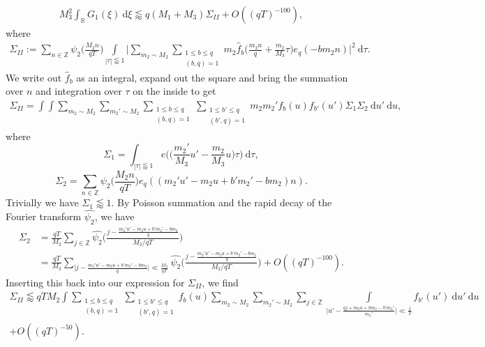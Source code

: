 \documentclass[12pt]{amsart}
\theoremstyle{definition}
\theoremstyle{plain}
\theoremstyle{remark}
\numberwithin{equation}{section}
\numberwithin{theorem}{section}
\numberwithin{equation}{section}
\begin{document}
	\begin{align}
		M_{3}^{2}\int_{\mathbb{R}}G_{1}(\xi)\: \mathrm{d} \xi \lessapprox q(M_{1}+M_{3}) \varSigma_{II}+O((qT)^{-100}), \label{Sigma II equation}
	\end{align}
	where
	\begin{align*}
		\varSigma_{II} := \sum_{n \in \mathbb{Z}}\psi_{2}\bigg(\frac{M_{2}n}{qT}\bigg)
		\int \limits_{|\tau|\lessapprox 1}
		\biggl|\sum_{m_{2}\sim M_{2}}
		\sum_{\substack{1 \leq b \leq q \\ (b, q)=1}}m_{2}\hat{f}_{b}\bigg(\frac{m_{2}n}{q}+\frac{m_{2}}{M_{3}}\tau\bigg)
		e_q({-bm_{2}n})\biggl|^{2}\: \mathrm{d} \tau.
	\end{align*}
	We write out $\hat{f}_{b}$ as an integral, expand out the square and bring the summation over $n$ and integration over $\tau$ on the inside to get
	\begin{align*}
		\varSigma_{II}=\int \int
		\sum_{m_{2}\sim M_{2}}\sum_{m_{2}'\sim M_{2}}
		\sum_{\substack{1 \leq b \leq q \\ (b, q)=1}}
		\sum_{\substack{1 \leq b' \leq q \\ (b', q)=1}}
		m_{2}m_{2}'f_{b}(u)f_{b'}(u')
		\varSigma_{1}\varSigma_{2}\:\mathrm{d} u'\:\mathrm{d} u,
	\end{align*}
	where
	\[\varSigma_{1}=\int_{|\tau| \lessapprox 1} e\bigg(\bigg(\frac{m_{2}'}{M_{3}}u'-\frac{m_{2}}{M_{3}}u\bigg)\tau\bigg)\:\mathrm{d} \tau,\]
	\[\varSigma_{2}=\sum_{n \in \mathbb{Z}}\psi_{2}\bigg(\frac{M_{2}n}{qT}\bigg)
	e_q({(m_{2}'u'-m_2u+b'm_2'-bm_2)n}).\]
	Trivially we have $\varSigma_{1} \lessapprox 1$. By Poisson summation and the rapid decay of the Fourier transform $\hat{\psi_{2}}$, we have 
	\begin{align*}
		\varSigma_{2}&=\frac{qT}{M_{2}}\sum_{j \in \mathbb{Z}}\hat{\psi_{2}}\bigg(\frac{j-\frac{m_{2}'u'-m_{2}u+b'm_{2}'-bm_{2}}{q}}{M_{2}/qT}\bigg)
		\\
		&=\frac{qT}{M_{2}}\sum_{\big|j-\frac{m_{2}'u'-m_{2}u+b'm_{2}'-bm_{2}}{q}\big|\ll \frac{M_{2}}{qT}}\hat{\psi_{2}}\bigg(\frac{j-\frac{m_{2}'u'-m_{2}u+b'm_{2}'-bm_{2}}{q}}{M_{2}/qT}\bigg)+O((qT)^{-100}).
	\end{align*}
	Inserting this back into our expression for $\varSigma_{II}$, we find
	\begin{align*}
		\varSigma_{II} \lessapprox qTM_{2}
		\int
		\sum_{\substack{1 \leq b \leq q \\ (b, q)=1}}
		\sum_{\substack{1 \leq b' \leq q \\ (b', q)=1}}
		f_{b}(u)
		\sum_{m_{2}\sim M_{2}}\sum_{m_{2}'\sim M_{2}}
		\sum_{j \in \mathbb{Z}}
		\int\limits_{\big|u'-\frac{qj+m_{2}u+bm_{2}-b'm_{2}'}{m_{2}'}\big|\ll \frac{1}{T}} f_{b'}(u')
		\:\mathrm{d} u'\:\mathrm{d} u
		\\
		+O((qT)^{-50}).
	\end{align*}
\end{document}
